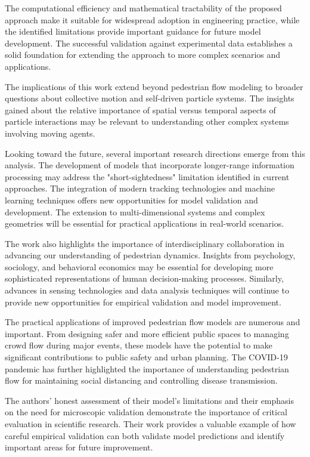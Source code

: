 \documentclass[12pt,a4paper]{article}
\begin{document}
The computational efficiency and mathematical tractability of the proposed approach make it suitable for widespread adoption in engineering practice, while the identified limitations provide important guidance for future model development. The successful validation against experimental data establishes a solid foundation for extending the approach to more complex scenarios and applications.

The implications of this work extend beyond pedestrian flow modeling to broader questions about collective motion and self-driven particle systems. The insights gained about the relative importance of spatial versus temporal aspects of particle interactions may be relevant to understanding other complex systems involving moving agents.

Looking toward the future, several important research directions emerge from this analysis. The development of models that incorporate longer-range information processing may address the "short-sightedness" limitation identified in current approaches. The integration of modern tracking technologies and machine learning techniques offers new opportunities for model validation and development. The extension to multi-dimensional systems and complex geometries will be essential for practical applications in real-world scenarios.

The work also highlights the importance of interdisciplinary collaboration in advancing our understanding of pedestrian dynamics. Insights from psychology, sociology, and behavioral economics may be essential for developing more sophisticated representations of human decision-making processes. Similarly, advances in sensing technologies and data analysis techniques will continue to provide new opportunities for empirical validation and model improvement.

The practical applications of improved pedestrian flow models are numerous and important. From designing safer and more efficient public spaces to managing crowd flow during major events, these models have the potential to make significant contributions to public safety and urban planning. The COVID-19 pandemic has further highlighted the importance of understanding pedestrian flow for maintaining social distancing and controlling disease transmission.

The authors' honest assessment of their model's limitations and their emphasis on the need for microscopic validation demonstrate the importance of critical evaluation in scientific research. Their work provides a valuable example of how careful empirical validation can both validate model predictions and identify important areas for future improvement.
\end{document}
